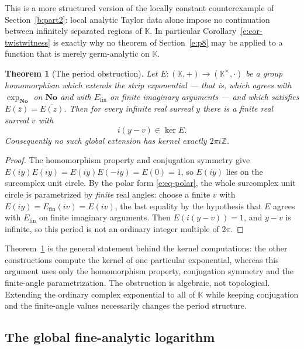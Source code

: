 \documentclass[11pt,a4paper]{article}
\numberwithin{equation}{section}
\newtheorem{theorem}{Theorem}[section]
\theoremstyle{definition}
\theoremstyle{remark}
\theoremstyle{plain}
\newcommand{\K}{\mathbb K}
\newcommand{\No}{\mathbf{No}}
\newcommand{\ZZ}{\mathbb Z}
\begin{document}
This is a more structured version of the locally constant counterexample of
Section~\ref{b:part2}: local analytic Taylor data alone impose no continuation between
infinitely separated regions of $\K$.  In particular
Corollary~\ref{e:cor-twistwitness} is exactly why no theorem of Section~\ref{e:p8} may
be applied to a function that is merely germ-analytic on $\K$.

\begin{theorem}[The period obstruction]\label{e:thm-periodobstruction}
Let $E:(\K,+)\to(\K^{\times},\cdot)$ be a group homomorphism which
extends the strip exponential --- that is, which agrees with
$\exp_{\No}$ on $\No$ and with $E_{\mathrm{fin}}$ on finite imaginary
arguments --- and which satisfies $E(\bar z)=\overline{E(z)}$.  Then for
every \emph{infinite} real surreal $y$ there is a \emph{finite} real
surreal $v$ with
\begin{equation}\label{e:eq-periodobstruction}
 i(y-v)\in\ker E .
\end{equation}
Consequently no such global extension has kernel exactly $2\pi i\ZZ$.
\end{theorem}

\begin{proof}
The homomorphism property and conjugation symmetry give
$E(iy)\overline{E(iy)}=E(iy)E(-iy)=E(0)=1$, so $E(iy)$ lies on the
surcomplex unit circle.  By the polar form
\eqref{e:eq-polar}, the whole surcomplex unit circle is parametrized by
\emph{finite} real angles: choose a finite $v$ with
$E(iy)=E_{\mathrm{fin}}(iv)=E(iv)$, the last equality by the hypothesis
that $E$ agrees with $E_{\mathrm{fin}}$ on finite imaginary arguments.
Then $E(i(y-v))=1$, and $y-v$ is infinite, so this period is not an
ordinary integer multiple of $2\pi$.
\end{proof}

Theorem~\ref{e:thm-periodobstruction} is the general statement behind the
kernel computations: the other constructions compute the kernel of one
particular exponential, whereas this argument uses only the homomorphism
property, conjugation symmetry and the finite-angle parametrization.  The
obstruction is algebraic, not topological.  Extending the ordinary complex
exponential to all of $\K$ while keeping conjugation and the finite-angle
values necessarily changes the period structure.

\subsection{The global fine-analytic logarithm}\label{e:sec-globallog}
\end{document}
